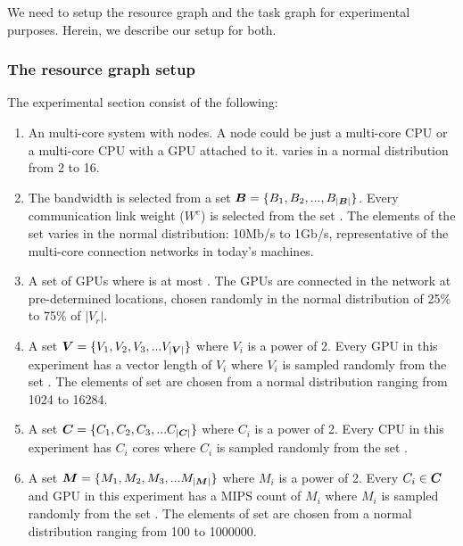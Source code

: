 We need to setup the resource graph and the task graph for experimental
purposes. Herein, we describe our setup for both.

\subsubsection{The resource graph setup}
\label{sec:resource-graph-setup}

The experimental section consist of the following:

\begin{enumerate}

\item An multi-core system with \numtplgynodes nodes. A node could be
  just a multi-core CPU or a multi-core CPU with a GPU attached to
  it. \numtplgynodes varies in a normal distribution from 2 to 16.

\item The bandwidth is selected from a set \mbox{$\bm{B} = \{B_1, B_2, ...,
  B_{|\bm{B}|}\}$}. Every communication link weight ($W^c$) is selected
from the set \bwset. The elements of the set \bwset varies in the normal
distribution: 10Mb/s to 1Gb/s, representative of the multi-core
connection networks in today's machines.

\item A set of \gpunum GPUs where \gpunum is at most \numtplgynodes. The
  GPUs are connected in the network at pre-determined locations, chosen
  randomly in the normal distribution of 25\% to 75\% of $|V_r|$.

\item A set $\bm{V} = \{V_1, V_2, V_3, ... V_{|\bm{V}|}\}$ where
  $V_i$ is a power of 2.  Every GPU in this experiment has a vector
  length of $V_i$ where $V_i$ is sampled randomly from the set
  \veclenset. The elements of set \veclenset are chosen from a normal
  distribution ranging from 1024 to 16284.

\item A set $\bm{C} = \{C_1, C_2, C_3, ... C_{|\bm{C}|}\}$
  where $C_i$ is a power of 2.  Every CPU in this experiment has $C_i$
  cores where $C_i$ is sampled randomly from the set \corenumset.

\item A set $\bm{M} = \{M_1, M_2, M_3, ... M_{|\bm{M}|}\}$ where
  $M_i$ is a power of 2.  Every $C_i \in \bm{C}$ and GPU in this
  experiment has a MIPS count of $M_i$ where $M_i$ is sampled randomly
  from the set \mipsset. The elements of set \mipsset are chosen from a
  normal distribution ranging from 100 to 1000000.

\end{enumerate}

